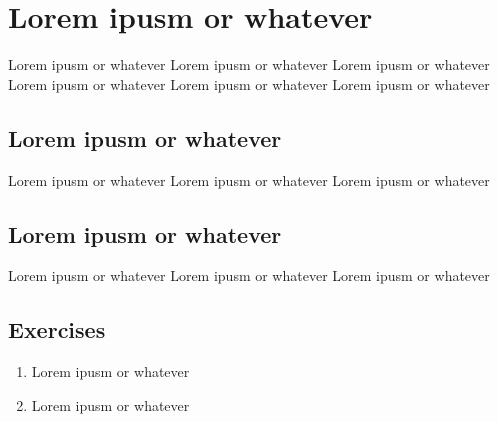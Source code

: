 \chapter{Lorem ipusm or whatever}
\label{chap:reference-frames}

Lorem ipusm or whatever Lorem ipusm or whatever Lorem ipusm or whatever 
Lorem ipusm or whatever Lorem ipusm or whatever Lorem ipusm or whatever

\section{Lorem ipusm or whatever}
\label{sec:reference-frames-overview}

Lorem ipusm or whatever Lorem ipusm or whatever Lorem ipusm or whatever

\section{Lorem ipusm or whatever}

Lorem ipusm or whatever Lorem ipusm or whatever Lorem ipusm or whatever

\section{Exercises}

\begin{enumerate}
  \item Lorem ipusm or whatever
  \item Lorem ipusm or whatever
\end{enumerate}
